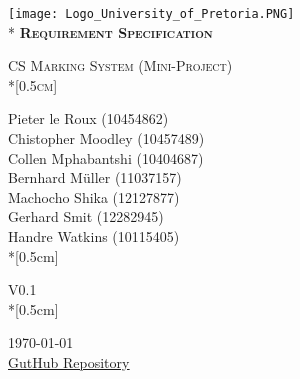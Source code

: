 \documentclass[12pt, a4paper]{scrartcl}
\begin{document}
         
	\begin{titlepage}
		\begin{center}
		\texttt{[image: Logo\_University\_of\_Pretoria.PNG]}\\*
		\vspace{3.0cm}
		\textsc{\LARGE \bf{Requirement Specification}}

		\textsc{\Large CS Marking System (Mini-Project)\\*[0.5cm]}

			Pieter le Roux (10454862)\\
			Chistopher Moodley (10457489)\\
			Collen Mphabantshi (10404687)\\
			Bernhard M\"uller (11037157)\\
			Machocho Shika (12127877)\\
			Gerhard Smit (12282945)\\
			Handre Watkins (10115405)\\*[0.5cm]

			V0.1\\*[0.5cm]

			{\large \today} \\

			\vspace{0.5cm}
			\href{https://github.com/HandreWatkins/Phase1-COS/}{\underline {GutHub Repository}}

		\end{center}
	\end{titlepage}


		\thispagestyle{empty}
\end{document}
